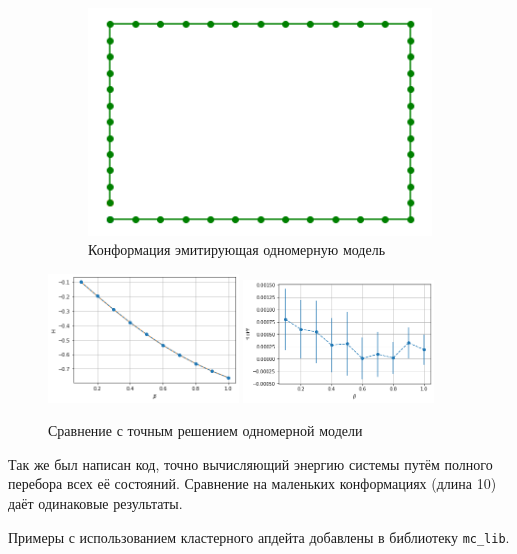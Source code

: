 \begin{figure}[H]
	\centering
	\begin{subfigure}[t]{0.45\textwidth}
		\includegraphics[width = \textwidth]{../images/1D_conf.png} 
		\caption{Конформация эмитирующая одномерную модель}
	\end{subfigure}
	\includegraphics[width = 0.45\textwidth]{../images/1D_ene.png}
	\includegraphics[width = 0.45\textwidth]{../images/1D_ene_diff.png} 
	\caption{Сравнение с точным решением одномерной модели}
\end{figure}

Так же был написан код, точно вычисляющий энергию системы путём полного перебора всех её состояний. Сравнение на маленьких конформациях (длина 10) даёт одинаковые результаты.


Примеры с использованием кластерного апдейта добавлены в библиотеку \texttt{mc\_lib}.